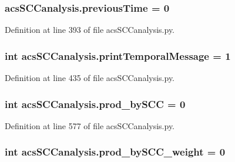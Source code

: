 \hypertarget{a00130_aff96a31e98ac46cb47a67b74f5d87351}{
\subsubsection[{previous\+Time}]{\setlength{\rightskip}{0pt plus 5cm}acs\+S\+C\+Canalysis.\+previous\+Time = 0}}\label{a00130_aff96a31e98ac46cb47a67b74f5d87351}


Definition at line 393 of file acs\+S\+C\+Canalysis.\+py.

\hypertarget{a00130_a3de1ee32e24403b152d565d8c52cf7fd}{
\subsubsection[{print\+Temporal\+Message}]{\setlength{\rightskip}{0pt plus 5cm}int acs\+S\+C\+Canalysis.\+print\+Temporal\+Message = 1}}\label{a00130_a3de1ee32e24403b152d565d8c52cf7fd}


Definition at line 435 of file acs\+S\+C\+Canalysis.\+py.

\hypertarget{a00130_abb2ac92624837ae48b882d145c5aab11}{
\subsubsection[{prod\+\_\+by\+S\+C\+C}]{\setlength{\rightskip}{0pt plus 5cm}int acs\+S\+C\+Canalysis.\+prod\+\_\+by\+S\+C\+C = 0}}\label{a00130_abb2ac92624837ae48b882d145c5aab11}


Definition at line 577 of file acs\+S\+C\+Canalysis.\+py.

\hypertarget{a00130_a5f45dbe461b3b18021c93780e87cc40e}{
\subsubsection[{prod\+\_\+by\+S\+C\+C\+\_\+weight}]{\setlength{\rightskip}{0pt plus 5cm}int acs\+S\+C\+Canalysis.\+prod\+\_\+by\+S\+C\+C\+\_\+weight = 0}}\label{a00130_a5f45dbe461b3b18021c93780e87cc40e}


